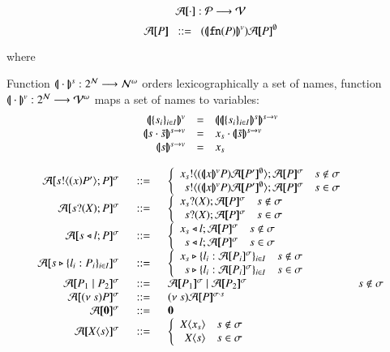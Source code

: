 \[
	\mathcal{A}[\!\![\cdot]\!\!] : \mathcal{P} \longrightarrow \mathcal{V}
\]
\[
	\amap{P} \bnfis \abs{\vmap{\fn{P}}}{\absmap{P}{\es}}
\]

where

Function $(\!|\!|\cdot|\!|\!)^s: 2^{\mathcal{N}} \longrightarrow \mathcal{N}^\omega$
orders lexicographically a set of names, function 
$(\!|\!|\cdot|\!|\!)^v: 2^{\mathcal{N}} \longrightarrow \mathcal{V}^\omega$
maps a set of names to variables:
\[
	\begin{array}{rcl}
		\vmap{\set{s_i}_{i \in I}} &=& \svmap{\smap{\set{s_i}_{i \in I}}}\\
		\svmap{s \cat \tilde{s}} &=& x_s \cat \svmap{\tilde{s}}\\
		\svmap{s} & = & x_s
	\end{array}
\]

\[
	\begin{array}{rcll}
		\absmap{\bout{s}{\abs{x} P'} P}{\sigma} &\bnfis&
		\left\{
		\begin{array}{rl}
			\bout{x_s}{\abs{\vmap{x}{P}} \absmap{P'}{\es}} \absmap{P}{\sigma} & s \notin \sigma\\
			\bout{s}{\abs{\vmap{x}{P}} \absmap{P'}{\es}} \absmap{P}{\sigma} & s \in \sigma
		\end{array}
		\right.
		\\
		\absmap{\binp{s}{X} P}{\sigma} &\bnfis&
		\left\{
		\begin{array}{rl}
			\binp{x_s}{X} \absmap{P}{\sigma} & s \notin \sigma\\
			\binp{s}{X} \absmap{P}{\sigma} & s \in \sigma
		\end{array}
		\right.
		\\
		\absmap{\bsel{s}{l} P}{\sigma} &\bnfis&
		\left\{
		\begin{array}{rl}
			\bsel{x_s}{l} \absmap{P}{\sigma} & s \notin \sigma\\
			\bsel{s}{l} \absmap{P}{\sigma} & s \in \sigma
		\end{array}
		\right.
		\\

		\absmap{\bbra{s}{l_i: P_i}_{i \in I}}{\sigma} &\bnfis&
		\left\{
		\begin{array}{rl}
			\bbra{x_s}{l_i: \absmap{P_i}{\sigma}}_{i \in I} & s \notin \sigma\\
			\bbra{s}{l_i: \absmap{P_i}{\sigma}}_{i \in I} & s \in \sigma\\
		\end{array}
		\right.
		\\

		\absmap{P_1 \Par P_2}{\sigma} &\bnfis& \absmap{P_1}{\sigma} \Par \absmap{P_2}{\sigma} & s \notin \sigma\\
		\absmap{\news{s} P}{\sigma} &\bnfis& \news{s} \absmap{P}{\sigma\cat s}\\
		\absmap{\inact}{\sigma} &\bnfis& \inact\\
		\absmap{\appl{\X}{s}}{\sigma} &\bnfis&
		\left\{
		\begin{array}{rl}
			\appl{\X}{x_s} & s \notin \sigma\\
			\appl{\X}{s} & s \in \sigma\\
		\end{array}
		\right.
	\end{array}
\]

